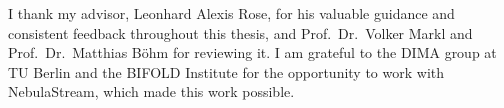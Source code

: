 I thank my advisor, Leonhard Alexis Rose, for his valuable guidance and consistent feedback throughout this thesis, and Prof.\ Dr.\ Volker Markl and Prof.\ Dr.\ Matthias B\"ohm for reviewing it.
I am grateful to the DIMA group at TU Berlin and the BIFOLD Institute for the opportunity to work with NebulaStream, which made this work possible.
